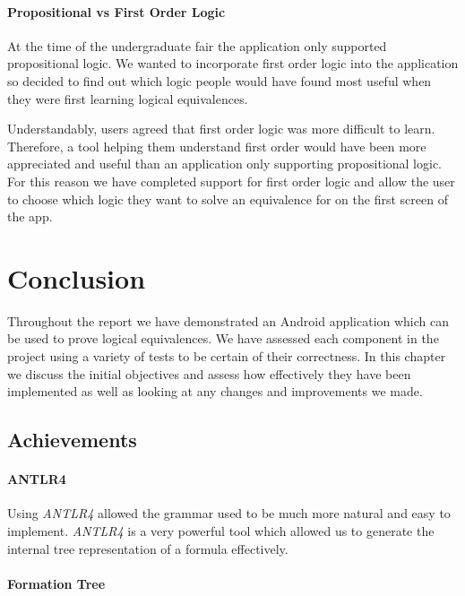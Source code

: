 \documentclass{report}
\begin{document}
\subsubsection{Propositional vs First Order Logic}

At the time of the undergraduate fair the application only supported propositional logic. We wanted to incorporate first order logic into the application so decided to find out which logic people would have found most useful when they were first learning logical equivalences.

Understandably, users agreed that first order logic was more difficult to learn. Therefore, a tool helping them understand first order would have been more appreciated and useful than an application only supporting propositional logic. For this reason we have completed support for first order logic and allow the user to choose which logic they want to solve an equivalence for on the first screen of the app.

\chapter{Conclusion}

Throughout the report we have demonstrated an Android application which can be used to prove logical equivalences. We have assessed each component in the project using a variety of tests to be certain of their correctness. In this chapter we discuss the initial objectives and assess how effectively they have been implemented as well as looking at any changes and improvements we made.

\section{Achievements}

\subsubsection{ANTLR4}

Using \emph{ANTLR4} allowed the grammar used to be much more natural and easy to implement. \emph{ANTLR4} is a very powerful tool which allowed us to generate the internal tree representation of a formula effectively.

\subsubsection{Formation Tree}
\end{document}
